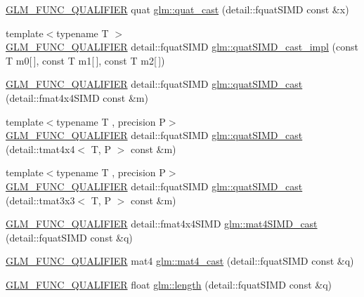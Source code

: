 \begin{DoxyCompactItemize}
\item 
\hyperlink{setup_8hpp_a33fdea6f91c5f834105f7415e2a64407}{G\+L\+M\+\_\+\+F\+U\+N\+C\+\_\+\+Q\+U\+A\+L\+I\+F\+I\+ER} quat \hyperlink{namespaceglm_a68af15a87ea3aac558767c9bb2ed141d}{glm\+::quat\+\_\+cast} (detail\+::fquat\+S\+I\+MD const \&x)
\item 
{\footnotesize template$<$typename T $>$ }\\\hyperlink{setup_8hpp_a33fdea6f91c5f834105f7415e2a64407}{G\+L\+M\+\_\+\+F\+U\+N\+C\+\_\+\+Q\+U\+A\+L\+I\+F\+I\+ER} detail\+::fquat\+S\+I\+MD \hyperlink{namespaceglm_a2e2bb4244525831b56079cdacc87948d}{glm\+::quat\+S\+I\+M\+D\+\_\+cast\+\_\+impl} (const T m0\mbox{[}$\,$\mbox{]}, const T m1\mbox{[}$\,$\mbox{]}, const T m2\mbox{[}$\,$\mbox{]})
\item 
\hyperlink{setup_8hpp_a33fdea6f91c5f834105f7415e2a64407}{G\+L\+M\+\_\+\+F\+U\+N\+C\+\_\+\+Q\+U\+A\+L\+I\+F\+I\+ER} detail\+::fquat\+S\+I\+MD \hyperlink{namespaceglm_a0c09f4c773ffd14c3d9246a50011cf0c}{glm\+::quat\+S\+I\+M\+D\+\_\+cast} (detail\+::fmat4x4\+S\+I\+MD const \&m)
\item 
{\footnotesize template$<$typename T , precision P$>$ }\\\hyperlink{setup_8hpp_a33fdea6f91c5f834105f7415e2a64407}{G\+L\+M\+\_\+\+F\+U\+N\+C\+\_\+\+Q\+U\+A\+L\+I\+F\+I\+ER} detail\+::fquat\+S\+I\+MD \hyperlink{namespaceglm_a9f05471745ec80855fe4d6559879ad64}{glm\+::quat\+S\+I\+M\+D\+\_\+cast} (detail\+::tmat4x4$<$ T, P $>$ const \&m)
\item 
{\footnotesize template$<$typename T , precision P$>$ }\\\hyperlink{setup_8hpp_a33fdea6f91c5f834105f7415e2a64407}{G\+L\+M\+\_\+\+F\+U\+N\+C\+\_\+\+Q\+U\+A\+L\+I\+F\+I\+ER} detail\+::fquat\+S\+I\+MD \hyperlink{namespaceglm_ac9fd0f70546c3bf30a8aa72691877199}{glm\+::quat\+S\+I\+M\+D\+\_\+cast} (detail\+::tmat3x3$<$ T, P $>$ const \&m)
\item 
\hyperlink{setup_8hpp_a33fdea6f91c5f834105f7415e2a64407}{G\+L\+M\+\_\+\+F\+U\+N\+C\+\_\+\+Q\+U\+A\+L\+I\+F\+I\+ER} detail\+::fmat4x4\+S\+I\+MD \hyperlink{namespaceglm_a0b2e5499072a338c1256735ecbf363ff}{glm\+::mat4\+S\+I\+M\+D\+\_\+cast} (detail\+::fquat\+S\+I\+MD const \&q)
\item 
\hyperlink{setup_8hpp_a33fdea6f91c5f834105f7415e2a64407}{G\+L\+M\+\_\+\+F\+U\+N\+C\+\_\+\+Q\+U\+A\+L\+I\+F\+I\+ER} mat4 \hyperlink{namespaceglm_a350adcfec63eb015dd2d9ee14a4e8cde}{glm\+::mat4\+\_\+cast} (detail\+::fquat\+S\+I\+MD const \&q)
\item 
\hyperlink{setup_8hpp_a33fdea6f91c5f834105f7415e2a64407}{G\+L\+M\+\_\+\+F\+U\+N\+C\+\_\+\+Q\+U\+A\+L\+I\+F\+I\+ER} float \hyperlink{namespaceglm_aaa8b73fac4aaa2acdfc98adc48cd15d0}{glm\+::length} (detail\+::fquat\+S\+I\+MD const \&q)

\end{DoxyCompactItemize}
